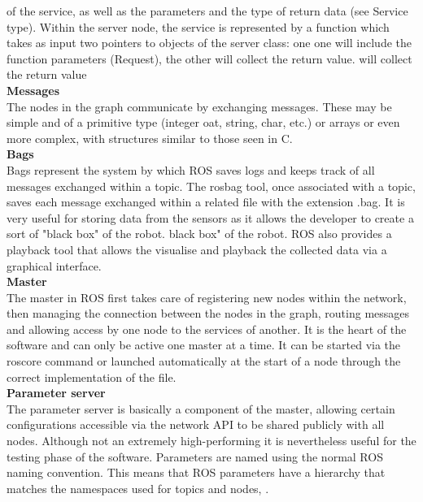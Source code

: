 of the service, as well as the parameters and the type of return data (see Service type).
Within the server node, the service is represented by a function
which takes as input two pointers to objects of the server class: one
one will include the function parameters (Request), the other will collect the return value.
will collect the return value \citet{rosservice}\\
\newline
\textbf{Messages}\\
The nodes in the graph communicate by exchanging messages. These
may be simple and of a primitive type (integer 
oat, string, char, etc.)
or arrays or even more complex, with structures similar to those seen in
C.\\
\newline
\textbf{Bags}\\
Bags represent the system by which ROS saves logs and keeps track of
all messages exchanged within a topic. The rosbag tool, once
associated with a topic, saves each message exchanged within a related file with the extension .bag. It is
very useful for storing data from the
sensors as it allows the developer to create a sort of "black box" of the robot.
black box" of the robot. ROS also provides a playback tool that allows the
visualise and playback the collected data via a graphical interface.\\
\newline
\textbf{Master}\\
The master in ROS first takes care of registering new nodes within the
network, then managing the connection between the nodes in the graph, routing
messages and allowing access by one node to the services of another.
It is the heart of the software and can only be active one master at a time. It can be started via the roscore command or launched automatically
at the start of a node through the correct implementation of the file.\\
\newline
\textbf{Parameter server}\\
The parameter server is basically a component of the master, allowing certain configurations accessible via the network API to be shared publicly with all nodes. Although not an extremely high-performing it is nevertheless useful for the testing phase of the software. Parameters are named using the normal ROS naming convention. This means that ROS parameters have a hierarchy that matches the namespaces used for topics and nodes, \citet{rosparmserv}.